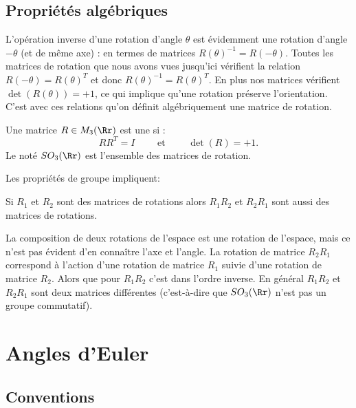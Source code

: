 \documentclass[11pt,class=report,crop=false]{standalone}
\begin{document}
\subsection{Propriétés algébriques}

L'opération inverse d'une rotation d'angle $\theta$ est évidemment une rotation d'angle $-\theta$ (et de même axe) : en termes de matrices $R(\theta)^{-1} = R(-\theta)$.
Toutes les matrices de rotation que nous avons vues jusqu'ici vérifient la relation $R(-\theta) = R(\theta)^T$ et donc $R(\theta)^{-1} = R(\theta)^T$. En plus nos matrices vérifient $\det(R(\theta)) = +1$, ce qui implique qu'une rotation préserve l'orientation. C'est avec ces relations qu'on définit algébriquement une matrice de rotation.

\begin{definition}
Une matrice $R \in M_3(\Rr)$ est une  si :
$$R R^T = I \qquad \text{ et } \qquad \det(R) = +1.$$
Le  noté $SO_3(\Rr)$ est l'ensemble des matrices de rotation.
\end{definition}

Les propriétés de groupe impliquent: 
\begin{proposition}
Si $R_1$ et $R_2$ sont des matrices de rotations alors $R_1R_2$ et $R_2R_1$ sont aussi des matrices de rotations.
\end{proposition}

La composition de deux rotations de l'espace est une rotation de l'espace, mais ce n'est pas évident d'en connaître l'axe et l'angle.
La rotation de matrice $R_2 R_1$ correspond à l'action d'une rotation de matrice $R_1$ suivie d'une rotation de matrice $R_2$. 
Alors que pour $R_1R_2$ c'est dans l'ordre inverse.
En général $R_1R_2$ et $R_2R_1$ sont deux matrices différentes (c'est-à-dire que $SO_3(\Rr)$ n'est pas un groupe commutatif).



\section{Angles d'Euler}

\subsection{Conventions}
\end{document}
